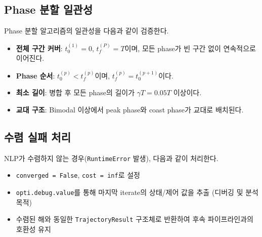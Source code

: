 \documentclass[11pt]{article}
\begin{document}
\subsection{Phase 분할 일관성}
\label{sec:phase_consistency}

Phase 분할 알고리즘의 일관성을 다음과 같이 검증한다.
\begin{itemize}
  \item \textbf{전체 구간 커버}: $t_0^{(1)} = 0$, $t_f^{(P)} = T$이며, 모든 phase가 빈 구간 없이 연속적으로 이어진다.
  \item \textbf{Phase 순서}: $t_0^{(p)} < t_f^{(p)}$이며, $t_f^{(p)} = t_0^{(p+1)}$이다.
  \item \textbf{최소 길이}: 병합 후 모든 phase의 길이가 $\gamma T = 0.05T$ 이상이다.
  \item \textbf{교대 구조}: Bimodal 이상에서 peak phase와 coast phase가 교대로 배치된다.
\end{itemize}


\subsection{수렴 실패 처리}
\label{sec:convergence_failure}

NLP가 수렴하지 않는 경우(\texttt{RuntimeError} 발생), 다음과 같이 처리한다.
\begin{itemize}
  \item \texttt{converged = False}, \texttt{cost = inf}로 설정
  \item \texttt{opti.debug.value}를 통해 마지막 iterate의 상태/제어 값을 추출 (디버깅 및 분석 목적)
  \item 수렴된 해와 동일한 \texttt{TrajectoryResult} 구조체로 반환하여 후속 파이프라인과의 호환성 유지
\end{itemize}




\end{document}
